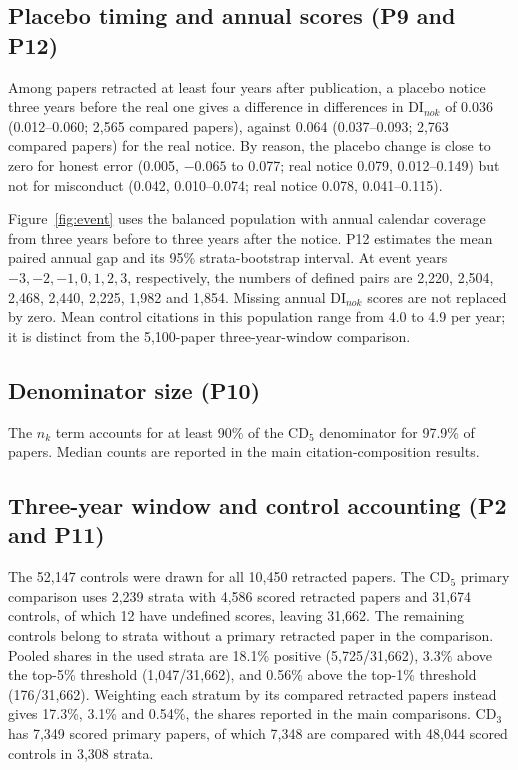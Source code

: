 \subsection{Placebo timing and annual scores (P9 and P12)}
Among papers retracted at least four years after publication, a placebo notice three years before the real one
gives a difference in differences in DI$_{nok}$ of 0.036 (0.012--0.060; 2,565 compared papers), against
0.064 (0.037--0.093; 2,763 compared papers) for the real notice. By reason, the placebo change is close to zero
for honest error (0.005, $-0.065$ to 0.077; real notice 0.079, 0.012--0.149) but not for misconduct
(0.042, 0.010--0.074; real notice 0.078, 0.041--0.115).

Figure~\ref{fig:event} uses the balanced population with annual calendar coverage from three years before to three
years after the notice. P12 estimates the mean paired annual gap and its 95\% strata-bootstrap interval.
At event years $-3,-2,-1,0,1,2,3$, respectively, the numbers of defined pairs are
2,220, 2,504, 2,468, 2,440, 2,225, 1,982 and 1,854. Missing annual DI$_{nok}$ scores are not replaced by zero.
Mean control citations in this population range from 4.0 to 4.9 per year; it is distinct from the 5,100-paper
three-year-window comparison.

\subsection{Denominator size (P10)}
The $n_k$ term accounts for at least 90\% of the CD$_5$ denominator for 97.9\% of papers.
Median counts are reported in the main citation-composition results.

\subsection{Three-year window and control accounting (P2 and P11)}
The 52,147 controls were drawn for all 10,450 retracted papers. The CD$_5$ primary comparison uses 2,239 strata
with 4,586 scored retracted papers and 31,674 controls, of which 12 have undefined scores, leaving 31,662.
The remaining controls belong to strata without a primary retracted paper in the comparison.
Pooled shares in the used strata are 18.1\% positive (5,725/31,662), 3.3\% above the top-5\% threshold
(1,047/31,662), and 0.56\% above the top-1\% threshold (176/31,662).
Weighting each stratum by its compared retracted papers instead gives 17.3\%, 3.1\% and 0.54\%, the shares
reported in the main comparisons. CD$_3$ has 7,349 scored primary papers, of which 7,348 are compared with
48,044 scored controls in 3,308 strata.


